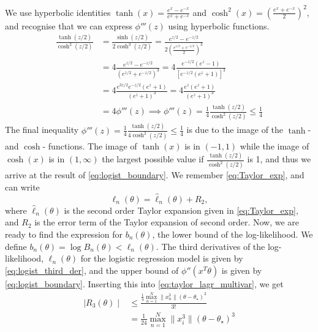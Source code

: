 We use hyperbolic identities $\tanh(x) =  \frac{e^x - e^{-x}}{e^x + e^{-x}}$ and $\cosh^2(x) = \left(\frac{e^x + e^{-x}}{2}\right)^2$, and recognise that we can express $\phi'''\left(z\right)$ using hyperbolic functions.
\begin{equation}\label{eq:logist_boundary}
\begin{split}
\frac{\tanh(z/2)}{\cosh^2(z/2)}  &= \frac{\sinh(z/2)}{2\cosh^3(z/2)} 
= \frac{e^{z/2} - e^{-z/2}}{2\left(\frac{e^{z/2} + e^{-z/2}}{2}\right)^3} \\
& = 4\frac{e^{z/2} - e^{-z/2}}{\left(e^{z/2} + e^{-z/2}\right)^3}
 = 4\frac{e^{-z/2}\left(e^z -1\right)}{\left[e^{-z/2}\left(e^z + 1\right)\right]^3} \\
& = 4\frac{e^{3z/2}e^{-z/2}\left(e^z+1\right)}{\left(e^z + 1\right)^3} 
 = 4 \frac{e^z\left(e^z + 1\right)}{\left(e^z +1 \right)^3} \\
& = 4\phi'''(z) 
\implies \phi'''(z) = \frac{1}{4}\frac{\tanh(z/2)}{\cosh^2(z/2)} \leq \frac{1}{4}
\end{split}
\end{equation}
The final inequality $\phi'''\left(z\right) = \frac{1}{4}\frac{\tanh\left(z/2\right)}{4\cosh^2\left(z/2\right)} \leq \frac{1}{4}$ is due to the image of the $\tanh$- and $\cosh$- functions.
The image of $\tanh\left(x\right)$ is in $\left(-1, 1\right)$  while the image of $\cosh\left(x\right)$ is in $\left(1, \infty\right)$ the largest possible value if $\frac{\tanh\left(z/2\right)}{\cosh^2\left(z/2\right)}$ is 1, and thus we arrive at the result of \eqref{eq:logist_boundary}.  
We remember \eqref{eq:Taylor_exp}, and can write 
\begin{equation}
    \ell_n\left(\theta\right) = \hat{\ell}_n\left(\theta\right) + R_2, 
\end{equation}
where $\hat{\ell}_n\left(\theta\right)$ is the second order Taylor expansion given in \eqref{eq:Taylor_exp}, and $R_2$ is the error term of the Taylor expansion of second order. Now, we are ready to find the expression for  $b_n\left(\theta\right)$, the lower bound of the log-likelihood. We define $b_n\left(\theta\right) = \log B_n\left(\theta\right) < \ell_n\left(\theta\right)$. The third derivatives of the log-likelihood, $\ell_n\left(\theta\right)$ for the logistic regression model is given by \eqref{eq:logist_third_der}, and the upper bound of $\phi''\left(x^T \theta\right)$ is given by \eqref{eq:logist_boundary}. Inserting this into \eqref{eq:taylor_lagr_multivar}, we get
\begin{equation}
\begin{split}
    \mid R_3\left(\theta\right) \mid &\leq \frac{\frac{1}{4}\max_{n=1}^N \lVert x_n^3 \rVert \left(\theta - \theta_{\star}\right)^3}{3!} \\
    & = \frac{1}{24} \max_{n=1}^N \lVert x_i^3\rVert \left(\theta-\theta_{\star}\right)^3
    \end{split}
\end{equation}


